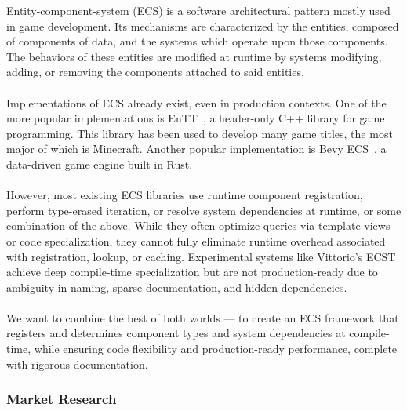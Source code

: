 Entity-component-system (ECS) is a software architectural pattern mostly used in game development.
Its mechanisms are characterized by the entities, composed of components of data,
and the systems which operate upon those components.
The behaviors of these entities are modified at runtime by systems modifying, adding, or removing the components
attached to said entities.
\\\\
Implementations of ECS already exist, even in production contexts.
One of the more popular implementations is EnTT~\cite{ValtoLibraries_EnTT}, a header-only C++ library for game programming.
This library has been used to develop many game titles, the most major of which is Minecraft.
Another popular implementation is Bevy ECS~\cite{Bevy_Engine}, a data-driven game engine built in Rust.
\\\\
However, most existing ECS libraries use runtime component registration, perform type-erased iteration, or resolve
system dependencies at runtime, or some combination of the above.
While they often optimize queries via template views or code specialization, they cannot fully eliminate
runtime overhead associated with registration, lookup, or caching.
Experimental systems like Vittorio's ECST~\cite{vittorio} achieve deep compile-time specialization
but are not production-ready due to ambiguity in naming, sparse documentation, and hidden dependencies.
\\\\
We want to combine the best of both worlds — to create an ECS framework that registers and determines component types
and system dependencies at compile-time, while ensuring code flexibility and production-ready performance, complete
with rigorous documentation.

\subsubsection*{Market Research}

